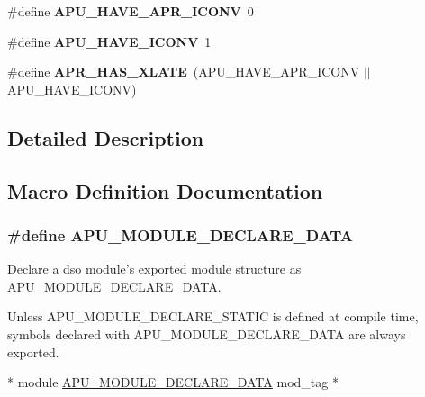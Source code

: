 \begin{DoxyCompactItemize}
\item 
\hypertarget{group___a_p_r___util_ga05728c17575e69d12092d21e47065610}{\#define {\bfseries A\-P\-U\-\_\-\-H\-A\-V\-E\-\_\-\-A\-P\-R\-\_\-\-I\-C\-O\-N\-V}~0}\label{group___a_p_r___util_ga05728c17575e69d12092d21e47065610}

\item 
\hypertarget{group___a_p_r___util_ga93b33ec545cbfd5ba93aa0104e197b01}{\#define {\bfseries A\-P\-U\-\_\-\-H\-A\-V\-E\-\_\-\-I\-C\-O\-N\-V}~1}\label{group___a_p_r___util_ga93b33ec545cbfd5ba93aa0104e197b01}

\item 
\hypertarget{group___a_p_r___util_ga1a88ee138f0f70a6dca12bc8415d8db4}{\#define {\bfseries A\-P\-R\-\_\-\-H\-A\-S\-\_\-\-X\-L\-A\-T\-E}~(A\-P\-U\-\_\-\-H\-A\-V\-E\-\_\-\-A\-P\-R\-\_\-\-I\-C\-O\-N\-V $|$$|$ A\-P\-U\-\_\-\-H\-A\-V\-E\-\_\-\-I\-C\-O\-N\-V)}\label{group___a_p_r___util_ga1a88ee138f0f70a6dca12bc8415d8db4}

\end{DoxyCompactItemize}


\subsection{Detailed Description}


\subsection{Macro Definition Documentation}
\hypertarget{group___a_p_r___util_ga9b0c0f8fe6546018d3a84a87fc3938f5}{
\subsubsection[{A\-P\-U\-\_\-\-M\-O\-D\-U\-L\-E\-\_\-\-D\-E\-C\-L\-A\-R\-E\-\_\-\-D\-A\-T\-A}]{\setlength{\rightskip}{0pt plus 5cm}\#define A\-P\-U\-\_\-\-M\-O\-D\-U\-L\-E\-\_\-\-D\-E\-C\-L\-A\-R\-E\-\_\-\-D\-A\-T\-A}}\label{group___a_p_r___util_ga9b0c0f8fe6546018d3a84a87fc3938f5}
Declare a dso module's exported module structure as A\-P\-U\-\_\-\-M\-O\-D\-U\-L\-E\-\_\-\-D\-E\-C\-L\-A\-R\-E\-\_\-\-D\-A\-T\-A.

Unless A\-P\-U\-\_\-\-M\-O\-D\-U\-L\-E\-\_\-\-D\-E\-C\-L\-A\-R\-E\-\_\-\-S\-T\-A\-T\-I\-C is defined at compile time, symbols declared with A\-P\-U\-\_\-\-M\-O\-D\-U\-L\-E\-\_\-\-D\-E\-C\-L\-A\-R\-E\-\_\-\-D\-A\-T\-A are always exported. 
\begin{DoxyCode}
* module \hyperlink{group___a_p_r___util_ga9b0c0f8fe6546018d3a84a87fc3938f5}{APU\_MODULE\_DECLARE\_DATA} mod\_tag
* 
\end{DoxyCode}
 